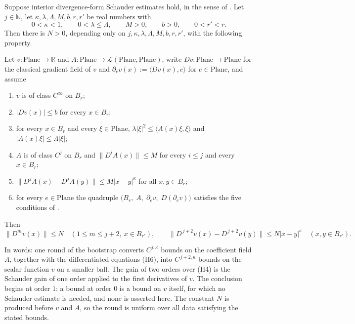 \begin{lemma}
Suppose interior divergence-form Schauder estimates hold, in the sense of
.  Let $j\in\mathbb{N}$, let $\kappa,\lambda,\Lambda,M,b,r,r'$ be
real numbers with
\[
  0<\kappa<1,\qquad 0<\lambda\le\Lambda,\qquad M>0,\qquad b>0,\qquad 0<r'<r .
\]
Then there is $N>0$, depending only on $j,\kappa,\lambda,\Lambda,M,b,r,r'$, with the following
property.

Let $v\colon\mathrm{Plane}\to\mathbb{R}$ and
$A\colon\mathrm{Plane}\to\mathcal{L}(\mathrm{Plane},\mathrm{Plane})$, write
$Dv\colon\mathrm{Plane}\to\mathrm{Plane}$ for the classical gradient field of $v$ and
$\partial_ev(x):=\langle Dv(x),e\rangle$ for $e\in\mathrm{Plane}$, and assume
\begin{enumerate}
\item[(H1)] $v$ is of class $C^{\infty}$ on $B_r$;
\item[(H2)] $\lvert Dv(x)\rvert\le b$ for every $x\in B_r$;
\item[(H3)] for every $x\in B_r$ and every $\xi\in\mathrm{Plane}$,
  $\lambda\lvert\xi\rvert^{2}\le\langle A(x)\xi,\xi\rangle$ and
  $\lvert A(x)\xi\rvert\le\Lambda\lvert\xi\rvert$;
\item[(H4)] $A$ is of class $C^{j}$ on $B_r$ and
  $\lVert D^{i}A(x)\rVert\le M$ for every $i\le j$ and every $x\in B_r$;
\item[(H5)] $\lVert D^{j}A(x)-D^{j}A(y)\rVert\le M\lvert x-y\rvert^{\kappa}$ for all
  $x,y\in B_r$;
\item[(H6)] for every $e\in\mathrm{Plane}$ the quadruple
  $\bigl(B_r,\;A,\;\partial_ev,\;D(\partial_ev)\bigr)$ satisfies the five conditions of
  .
\end{enumerate}
Then
\[
  \bigl\lVert D^{m}v(x)\bigr\rVert\le N
  \quad(1\le m\le j+2,\ x\in B_{r'}),
  \qquad
  \bigl\lVert D^{\,j+2}v(x)-D^{\,j+2}v(y)\bigr\rVert\le N\lvert x-y\rvert^{\kappa}
  \quad(x,y\in B_{r'}).
\]

In words: one round of the bootstrap converts $C^{j,\kappa}$ bounds on the coefficient field
$A$, together with the differentiated equations (H6), into $C^{\,j+2,\kappa}$ bounds on the
scalar function $v$ on a smaller ball.  The gain of two orders over (H4) is the Schauder gain of
one order applied to the first derivatives of $v$.  The conclusion begins at order $1$: a bound
at order $0$ is a bound on $v$ itself, for which no Schauder estimate is needed, and none is
asserted here.  The constant $N$ is produced before $v$ and $A$, so the round is uniform over
all data satisfying the stated bounds.
\end{lemma}
